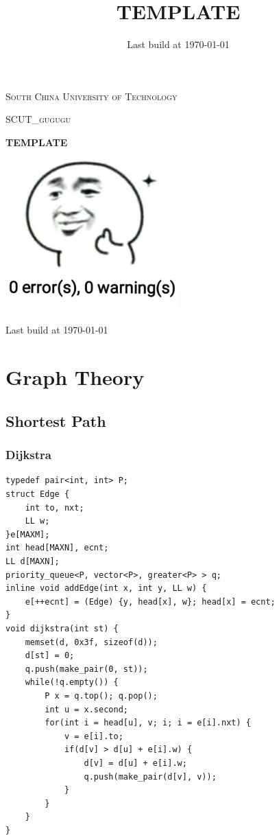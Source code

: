 \documentclass[10pt]{ctexart}
\title{TEMPLATE}
\author{}
\date{Last build at \today}
\begin{document}
{
\begin{titlepage}
    \centering
    \vspace{2cm}
    {\scshape\Large South China University of Technology \par}
    \vspace{1cm}
    {\scshape\Large SCUT\_gugugu\par}
    \vspace{1.5cm}
    {\Huge\bfseries TEMPLATE\par}
    \vspace{4.5cm}
    \includegraphics[width=0.5\textwidth]{./LOGO}\par\vspace{1cm}

    \vfill

    {\large Last build at \today\par}

\thispagestyle{empty}
\end{titlepage}
\tableofcontents
\newpage
\section{Graph Theory}
\subsection{Shortest Path}
\subsubsection{Dijkstra}
\begin{lstlisting}
typedef pair<int, int> P;
struct Edge {
    int to, nxt;
    LL w;
}e[MAXM];
int head[MAXN], ecnt;
LL d[MAXN];
priority_queue<P, vector<P>, greater<P> > q;
inline void addEdge(int x, int y, LL w) {
    e[++ecnt] = (Edge) {y, head[x], w}; head[x] = ecnt;
}
void dijkstra(int st) {
    memset(d, 0x3f, sizeof(d));
    d[st] = 0;
    q.push(make_pair(0, st));
    while(!q.empty()) {
        P x = q.top(); q.pop();
        int u = x.second;
        for(int i = head[u], v; i; i = e[i].nxt) {
            v = e[i].to;
            if(d[v] > d[u] + e[i].w) {
                d[v] = d[u] + e[i].w;
                q.push(make_pair(d[v], v));
            }
        }
    }
}
\end{lstlisting}
}
\end{document}
